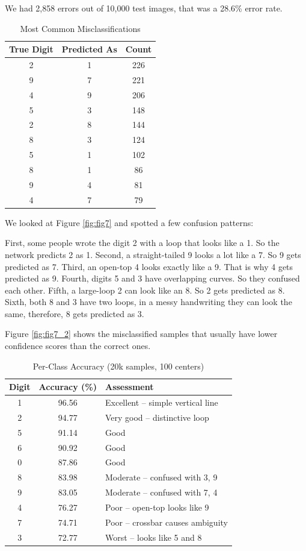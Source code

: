 \documentclass[12pt]{article}
\begin{document}
We had 2,858 errors out of 10,000 test images, that was a 28.6\% error rate.

\begin{table}[H]
	\centering
	\caption{Most Common Misclassifications}
	\begin{tabular}{ccc}
		\toprule
		\textbf{True Digit} & \textbf{Predicted As} & \textbf{Count} \\
		\midrule
		2 & 1 & 226 \\
		9 & 7 & 221 \\
		4 & 9 & 206 \\
		5 & 3 & 148 \\
		2 & 8 & 144 \\
		8 & 3 & 124 \\
		5 & 1 & 102 \\
		8 & 1 & 86 \\
		9 & 4 & 81 \\
		4 & 7 & 79 \\
		\bottomrule
	\end{tabular}
\end{table}

We looked at Figure \ref{fig:fig7} and spotted a few confusion patterns:

First, some people wrote the digit 2 with a loop that looks like a 1. So the network predicts 2 as 1. Second, a straight-tailed 9 looks a lot like a 7. So 9 gets predicted as 7. Third, an open-top 4 looks exactly like a 9. That is why 4 gets predicted as 9. Fourth, digits 5 and 3 have overlapping curves. So they confused each other. Fifth, a large-loop 2 can look like an 8. So 2 gets predicted as 8. Sixth, both 8 and 3 have two loops, in a messy handwriting they can look the same, therefore, 8 gets predicted as 3.

Figure \ref{fig:fig7_2} shows the misclassified samples that usually have lower confidence scores than the correct ones.

\begin{table}[H]
	\centering
	\caption{Per-Class Accuracy (20k samples, 100 centers)}
	\begin{tabular}{ccl}
		\toprule
		\textbf{Digit} & \textbf{Accuracy (\%)} & \textbf{Assessment} \\
		\midrule
		1 & 96.56 & Excellent – simple vertical line \\
		2 & 94.77 & Very good – distinctive loop \\
		5 & 91.14 & Good \\
		6 & 90.92 & Good \\
		0 & 87.86 & Good \\
		8 & 83.98 & Moderate – confused with 3, 9 \\
		9 & 83.05 & Moderate – confused with 7, 4 \\
		4 & 76.27 & Poor – open-top looks like 9 \\
		7 & 74.71 & Poor – crossbar causes ambiguity \\
		3 & 72.77 & Worst – looks like 5 and 8 \\
		\bottomrule
	\end{tabular}
\end{table}
\end{document}
